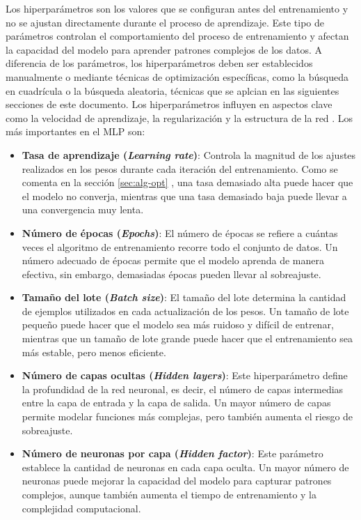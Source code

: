 Los hiperparámetros son los valores que se configuran antes del entrenamiento y no se ajustan directamente durante el proceso de aprendizaje. Este tipo de parámetros controlan el comportamiento del proceso de entrenamiento y afectan la capacidad del modelo para aprender patrones complejos de los datos. A diferencia de los parámetros, los hiperparámetros deben ser establecidos manualmente o mediante técnicas de optimización específicas, como la búsqueda en cuadrícula o la búsqueda aleatoria, técnicas que se aplcian en las siguientes secciones de este documento. Los hiperparámetros influyen en aspectos clave como la velocidad de aprendizaje, la regularización y la estructura de la red \cite{chollet2018deep}. Los más importantes en el MLP son:

\begin{itemize}

    \item \textbf{Tasa de aprendizaje (\textit{Learning rate})}: Controla la magnitud de los ajustes realizados en los pesos durante cada iteración del entrenamiento. Como se comenta en la sección \ref{sec:alg-opt} , una tasa demasiado alta puede hacer que el modelo no converja, mientras que una tasa demasiado baja puede llevar a una convergencia muy lenta.
    
    \item \textbf{Número de épocas (\textit{Epochs})}: El número de épocas se refiere a cuántas veces el algoritmo de entrenamiento recorre todo el conjunto de datos. Un número adecuado de épocas permite que el modelo aprenda de manera efectiva, sin embargo, demasiadas épocas pueden llevar al sobreajuste.
    
    \item \textbf{Tamaño del lote (\textit{Batch size})}: El tamaño del lote determina la cantidad de ejemplos utilizados en cada actualización de los pesos. Un tamaño de lote pequeño puede hacer que el modelo sea más ruidoso y difícil de entrenar, mientras que un tamaño de lote grande puede hacer que el entrenamiento sea más estable, pero menos eficiente.
    
    \item \textbf{Número de capas ocultas (\textit{Hidden layers})}: Este hiperparámetro define la profundidad de la red neuronal, es decir, el número de capas intermedias entre la capa de entrada y la capa de salida. Un mayor número de capas permite modelar funciones más complejas, pero también aumenta el riesgo de sobreajuste.
    
    \item \textbf{Número de neuronas por capa (\textit{Hidden factor})}: Este parámetro establece la cantidad de neuronas en cada capa oculta. Un mayor número de neuronas puede mejorar la capacidad del modelo para capturar patrones complejos, aunque también aumenta el tiempo de entrenamiento y la complejidad computacional.
\end{itemize}



